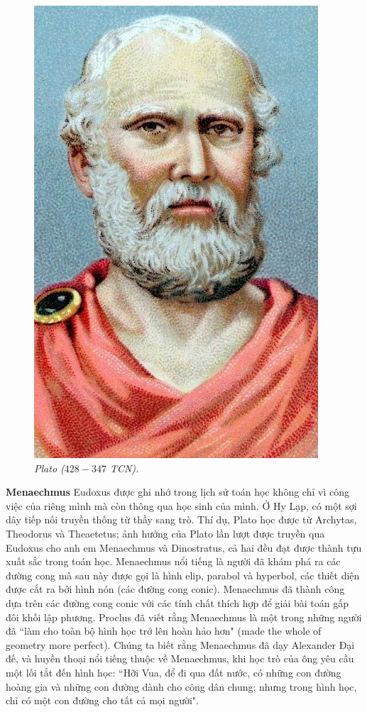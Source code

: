 \begin{multicols}{2}
\begin{figure}[H]
		\includegraphics[width= 0.65\linewidth]{4}
		\caption{\small\textit{\color{lichsutoanhoc}Plato ($428-347$ TCN).}}
		\vspace*{-10pt}
	\end{figure}
	\textbf{\color{lichsutoanhoc}Menaechmus}
	\vskip 0.05cm
	Eudoxus được ghi nhớ trong lịch sử toán học không chỉ vì công việc của riêng mình mà còn thông qua học sinh của mình. 
	\vskip 0.05cm
	Ở Hy Lạp, có một sợi dây tiếp nối truyền thống từ thầy sang trò.  Thí dụ, Plato học được từ Archytas, Theodorus và Theaetetus; ảnh hưởng của Plato lần lượt được truyền qua Eudoxus cho anh em Menaechmus và Dinostratus, cả hai đều đạt được thành tựu xuất sắc trong toán học. 
	\vskip 0.05cm
	Menaechmus nổi tiếng là người đã khám phá ra các đường cong mà sau này được gọi là hình elip, parabol và hyperbol, các thiết diện được cắt ra bởi hình nón (các đường cong conic).
	\vskip 0.05cm
	Menaechmus đã thành công dựa trên các đường cong conic với các tính chất thích hợp để giải bài toán gấp đôi khối lập phương. 
	\vskip 0.05cm
	Proclus đã viết rằng Menaechmus là một trong những người đã ``làm cho toàn bộ hình học trở lên hoàn hảo hơn" (made the whole of geometry more perfect). Chúng ta biết rằng Menaechmus đã dạy Alexander Đại đế, và huyền thoại nổi tiếng thuộc về Menaechmus, khi học trò của ông yêu cầu một lối tắt đến hình học: ``Hỡi Vua, để đi qua đất nước, có những con đường hoàng gia và những con đường dành cho công dân chung; nhưng trong hình học, chỉ có một con đường cho tất cả mọi người".

\end{multicols}
